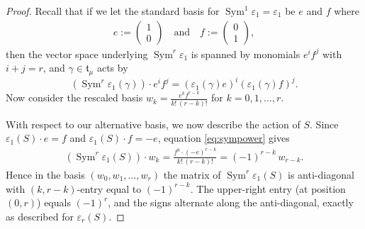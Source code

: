 \documentclass[11pt]{article}
\DeclareMathOperator{\Sym}{Sym}
\begin{document}
\begin{proof}
    Recall that if we let the standard basis for $\Sym^1\varepsilon_1 = \varepsilon_1$ be $e$ and $f$ where
        \begin{eqnarray*}
            e := \left(
                \begin{matrix}
                    1\\0
                \end{matrix}\right) 
            \quad \text{and} \quad
            f := \left(
                \begin{matrix}
                    0\\1
                \end{matrix}\right),
    \end{eqnarray*}
    then the vector space underlying $\Sym^r\varepsilon_1$ is spanned by monomials $e^if^j$ with $i+j=r$, and $\gamma\in \mathfrak{t}_\mu $ acts by
        \begin{equation}\label{eq:sympower}
            \left(\Sym^r\varepsilon_1(\gamma)\right) \cdot e^if^j = (\varepsilon_1(\gamma)e)^i(\varepsilon_1(\gamma)f)^j.    
        \end{equation}
    Now consider the rescaled basis $ w_k = \frac{e^k f^{r-k}}{k!\,(r-k)!}$ for $ k=0,1,\ldots,r $.

    With respect to our alternative basis, we now describe the {action of $ S $.} Since $ \varepsilon_1(S)\cdot e = f $ and $ \varepsilon_1(S) \cdot f = -e $, equation \eqref{eq:sympower} gives
        \begin{eqnarray*}
            \left(\Sym^r\varepsilon_1(S)\right)\cdot w_k = \frac{f^k\cdot(-e)^{r-k}}{k!\,(r-k)!} = (-1)^{r-k}\,w_{r-k}.
        \end{eqnarray*}
    Hence in the basis $(w_0, w_1, \ldots, w_r)$ the matrix of $\Sym^r\varepsilon_1(S)$ is anti-diagonal with $(k,r-k)$-entry equal to $(-1)^{r-k}$. The upper-right entry (at position $(0,r)$) equals $(-1)^r$, and the signs alternate along the anti-diagonal, exactly as described for $\varepsilon_r(S)$.


\end{proof}
\end{document}
